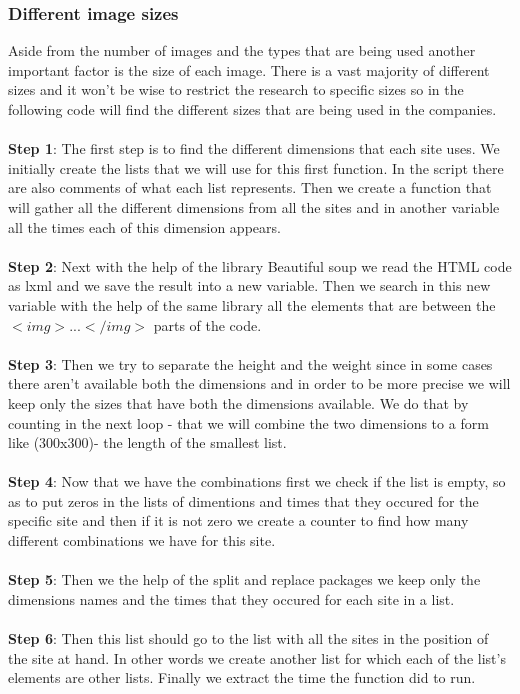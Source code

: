 \documentclass{book}
\begin{document}
\subsubsection{Different image sizes}\label{dif_img_s} 
Aside from the number of images and the types that are being used another important factor is the size of each image. There is a vast majority of different sizes and it won't be wise to restrict the research to specific sizes so in the following code will find the different sizes that are being used in the companies.\\\\
\textbf{Step 1}: The first step is to find the different dimensions that each site uses. We initially create the lists that we will use for this first function. In the script there are also comments of what each list represents. Then we create a function that will gather all the different dimensions from all the sites and in another variable all the times each of this dimension appears. \\\\
\textbf{Step 2}: Next with the help of the library Beautiful soup we read the HTML code as lxml and we save the result into a new variable. Then we search in this new variable with the help of the same library all the elements that are between the $<img>...</img>$ parts of the code.\\\\
\textbf{Step 3}: Then we try to separate the height and the weight since in some cases there aren't available both the dimensions and in order to be more precise we will keep only the sizes that have both the dimensions available. We do that by counting in the next loop - that we will combine the two dimensions to a form like (300x300)- the length of the smallest list. \\\\
\textbf{Step 4}: Now that we have the combinations first we check if the list is empty, so as to put zeros in the lists of dimentions and times that they occured for the specific site and then if it is not zero we create a counter to find how many different combinations we have for this site.\\\\
\textbf{Step 5}: Then we the help of the split and replace packages we keep only the dimensions names and the times that they occured for each site in a list.\\\\
\textbf{Step 6}: Then this list should go to the list with all the sites in the position of the site at hand. In other words we create another list for which each of the list's elements are other lists. Finally we extract the time the function did to run.\\\\
\end{document}

